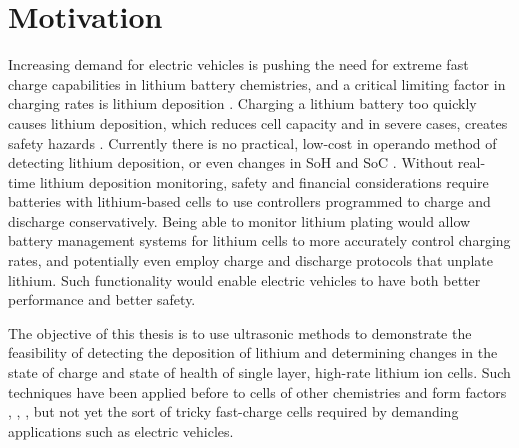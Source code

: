 \section{Motivation}
Increasing demand for electric vehicles is pushing the need for extreme fast charge capabilities in lithium battery chemistries, and a critical limiting factor in charging rates is lithium deposition \cite{XFC}. Charging a lithium battery too quickly causes lithium deposition, which reduces cell capacity and in severe cases, creates safety hazards \cite{XFC}. Currently there is no practical, low-cost in operando method of detecting lithium deposition, or even changes in SoH and SoC \cite{SOC-SOH-EST}. Without real-time lithium deposition monitoring, safety and financial considerations require batteries with lithium-based cells to use controllers programmed to charge and discharge conservatively. Being able to monitor lithium plating would allow battery management systems for lithium cells to more accurately control charging rates, and potentially even employ charge and discharge protocols that unplate lithium. Such functionality would enable electric vehicles  to have both better performance and better safety.

The objective of this thesis is to use ultrasonic methods to demonstrate the feasibility of detecting the deposition of lithium and determining changes in the state of charge and state of health of single layer, high-rate lithium ion cells. Such techniques have been applied before to cells of other chemistries and form factors \cite{SOC-SOH-EST}, \cite{TOF-STATE}, \cite{ANODE-CHAR}, but not yet the sort of tricky fast-charge cells required by demanding applications such as electric vehicles.